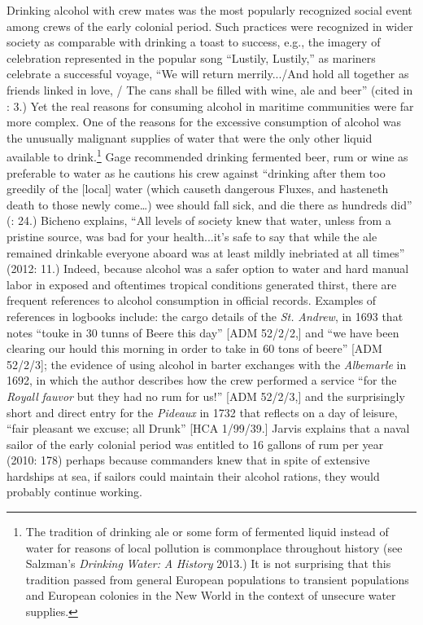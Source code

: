   Drinking alcohol with crew mates was the most popularly recognized social event among crews of the early colonial period. Such practices were recognized in wider society as comparable with drinking a toast to success, e.g., the imagery of celebration represented in the popular song “Lustily, Lustily,” as mariners celebrate a successful voyage, “We will return merrily.../And hold all together as friends linked in love, / The cans shall be filled with wine, ale and beer” (cited in \citealt{Palmer1986}: 3.) Yet the real reasons for consuming alcohol in maritime communities were far more complex. One of the reasons for the excessive consumption of alcohol was the unusually malignant supplies of water that were the only other liquid available to drink.\footnote{The tradition of drinking ale or some form of fermented liquid instead of water for reasons of local pollution is commonplace throughout history (see Salzman’s \textit{Drinking} \textit{Water:} \textit{A} \textit{History} 2013.) It is not surprising that this tradition passed from general European populations to transient populations and European colonies in the New World in the context of unsecure water supplies.}  Gage recommended drinking fermented beer, rum or wine as preferable to water as he cautions his crew against “drinking after them too greedily of the [local] water (which causeth dangerous Fluxes, and hasteneth death to those newly come…) wee should fall sick, and die there as hundreds did” (\citealt{Gage1648}: 24.) Bicheno explains, “All levels of society knew that water, unless from a pristine source, was bad for your health...it’s safe to say that while the ale remained drinkable everyone aboard was at least mildly inebriated at all times” (2012: 11.) Indeed, because alcohol was a safer option to water and hard manual labor in exposed and oftentimes tropical conditions generated thirst, there are frequent references to alcohol consumption in official records. Examples of references in logbooks include: the cargo details of the \textit{St.} \textit{Andrew}, in 1693 that notes “touke in 30 tunns of Beere this day” [ADM 52/2/2,] and “we have been clearing our hould this morning in order to take in 60 tons of beere” [ADM 52/2/3]; the evidence of using alcohol in barter exchanges with the \textit{Albemarle} in 1692, in which the author describes how the crew performed a service “for the \textit{Royall} \textit{fauvor} but they had no rum for us!” [ADM 52/2/3,] and the surprisingly short and direct entry for the \textit{Pideaux} in 1732 that reflects on a day of leisure, “fair pleasant we excuse; all Drunk” [HCA 1/99/39.] Jarvis explains that a naval sailor of the early colonial period was entitled to 16 gallons of rum per year (2010: 178) perhaps because commanders knew that in spite of extensive hardships at sea, if sailors could maintain their alcohol rations, they would probably continue working. 

